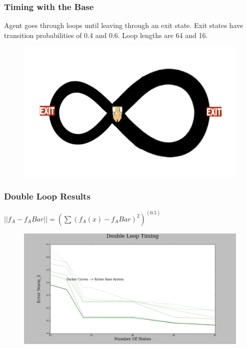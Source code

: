 \documentclass{beamer}
\begin{document}
\begin{frame}
\frametitle{Timing with the Base}
Agent goes through loops until leaving through an exit state. Exit states have transition probabilities of 0.4 and 0.6. Loop lengths are 64 and 16.
\begin{figure}
\includegraphics[width=0.8\linewidth]{lucasplots/monImages/doubleLoopImage.png}
\end{figure}
\end{frame}



\begin{frame}
\frametitle{Double Loop Results}

$||f_A - f_ABar|| = (\sum (f_A(x) - f_ABar)^2)^(0.5)$ 

\begin{figure}
\includegraphics[width=0.8\linewidth]{lucasplots/monImages/DoubleLoopTiming0.png}
\end{figure}
\end{frame}

\end{document}
